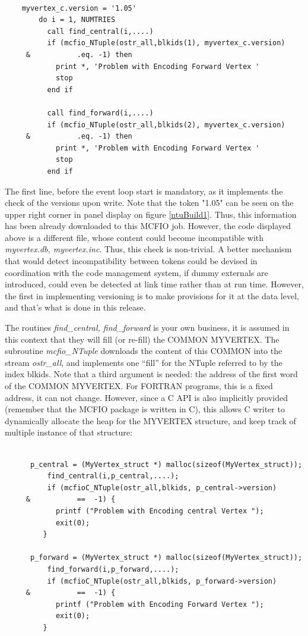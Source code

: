 \begin{verbatim}

	myvertex_c.version = '1.05'
        do i = 1, NUMTRIES
          call find_central(i,....)
          if (mcfio_NTuple(ostr_all,blkids(1), myvertex_c.version)
     &           .eq. -1) then
            print *, 'Problem with Encoding Forward Vertex '
            stop
          end if

          call find_forward(i,....)
          if (mcfio_NTuple(ostr_all,blkids(2), myvertex_c.version)
     &           .eq. -1) then
            print *, 'Problem with Encoding Forward Vertex '
            stop
          end if

\end{verbatim}

	The first line, before the event loop start is mandatory, as it
implements the check of the versions upon write. Note that the token "1.05"
can be seen on the upper right corner in panel display on figure
\ref{ntuBuild1}.  Thus, this information has been already downloaded to
this MCFIO job. However, the code displayed above is a different file,
whose content could become incompatible with {\em myvertex.db,
myvertex.inc}.  Thus, this check is non-trivial. A better mechanism that would
detect incompatibility between tokens could be devised in coordination with the
code management system, if dummy externals are introduced, could even be
detected at link time rather than at run time.  However, the first in
implementing versioning is to make provisions for it at the data level, and
that's what is done in this release.

The routines {\em find\_central, \em find\_forward} is your own business, it is
assumed in this context that they will fill (or re-fill) the COMMON
MYVERTEX.   The subroutine {\em mcfio\_NTuple} downloads the content of this
COMMON into the stream {\em ostr\_all}, and implements one ``fill'' for the
NTuple referred to by the index blkids.  Note that a third argument is needed:  the
address of the first word of the COMMON MYVERTEX. For FORTRAN programs,  this
is a fixed address, it can not change.  However, since a C API is  also
implicitly provided (remember that the MCFIO package is written in C), this
allows C writer to dynamically allocate the heap for the MYVERTEX  structure,
and keep track of multiple instance of that structure:

\begin{verbatim}

  	  p_central = (MyVertex_struct *) malloc(sizeof(MyVertex_struct));
          find_central(i,p_central,....);
          if (mcfioC_NTuple(ostr_all,blkids, p_central->version)
     &           ==  -1) {
            printf ("Problem with Encoding central Vertex ");
            exit(0);
         }

  	  p_forward = (MyVertex_struct *) malloc(sizeof(MyVertex_struct));
          find_forward(i,p_forward,....);
          if (mcfioC_NTuple(ostr_all,blkids, p_forward->version)
     &           ==  -1) {
            printf ("Problem with Encoding Forward Vertex ");
            exit(0);
         }

\end{verbatim}

